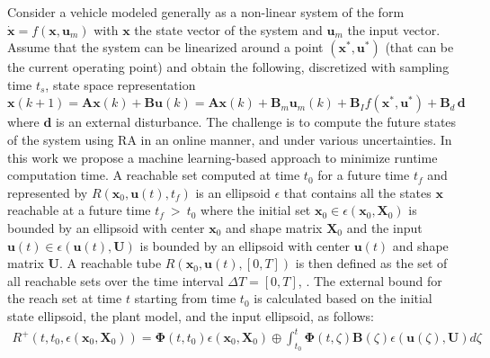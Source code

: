 Consider a vehicle modeled generally as a non-linear system of the form $\dot{\bm{x}} = f(\bm{x}, \bm{u}_m)$ with $\bm{x}$ the state vector of the system and $\bm{u}_m$ the input vector.
Assume that the system can be linearized around a point $\left(\bm{x}^{*}, \bm{u}^{*}\right)$ (that can be the current operating point) and obtain the following, discretized with sampling time $t_s$, state space representation $\bm{x}(k+1) =  \bm{A} \bm{x}(k) + \bm{B} \bm{u}(k) =  \bm{A} \bm{x}(k) + \bm{B}_m \bm{u}_m(k) + \bm{B}_I f\left(\bm{x}^{*}, \bm{u}^{*}\right) + \bm{B}_d \, \bm{d}$
where $\bm{d}$ is an external disturbance.  %
The challenge is to compute the future states of the system using RA in an online manner, and under various uncertainties.
In this work we propose a machine learning-based approach to minimize runtime computation time.
A reachable set computed at time $t_0$ for a future time $ t_f $ and represented by $R(\bm{x}_0, \bm{u}(t), t_f)$ is an ellipsoid $\epsilon$ that contains all the states $\bm{x}$ reachable at a future time $t_f ~>~ t_0$ where the initial set $ \bm{x}_0 \in \epsilon(\bm{x}_0, \bm{X}_0)$ is bounded by an ellipsoid with center $\bm{x}_0 $ and shape matrix $ \bm{X}_0 $ and the input $ \bm{u}(t) \in \epsilon(\bm{u}(t), \bm{U}) $ is bounded by an ellipsoid with center $ \bm{u}(t) $ and shape matrix $ \bm{U} $. 
A reachable tube $ R(\bm{x}_0, \bm{u}(t), [0,T] ) $ is then defined as the set of all reachable sets over the time interval $\Delta T = [0,T]$, \cite{esen17AHS, VaraiyaEllipsoid2006}. 
The external bound for the reach set at time $ t $ starting from time $t_0 $ is calculated based on the initial state ellipsoid, the plant model, and the input ellipsoid, as follows: 
\vspace{-5pt}
\begin{align*}
R^{+}(t, t_0, \epsilon(\bm{x}_0, \bm{X}_0)) = \bm{\Phi}(t,t_0)\epsilon(\bm{x}_0,\bm{X}_0)
\oplus \int_{t_0}^{t} \bm{\Phi}(t, \zeta) \bm{B}(\zeta) \epsilon(\bm{u}(\zeta), \bm{U})d\zeta
\end{align*}
